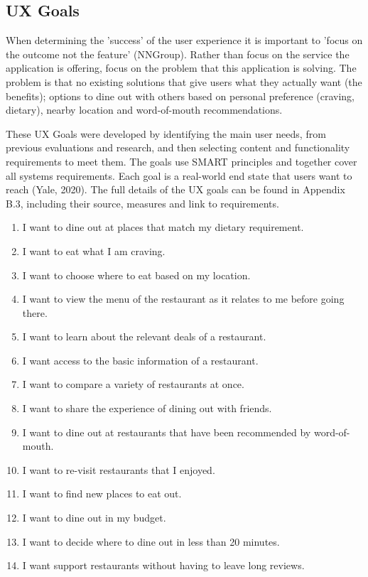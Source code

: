 \documentclass[a4 paper, 12pt]{article}
\begin{document}
\subsection{UX Goals}
When determining the 'success' of the user experience it is important to 'focus on the outcome not the feature' (NNGroup). Rather than focus on the service the application is offering, focus on the problem that this application is solving. The problem is that no existing solutions that give users what they actually want (the benefits); options to dine out with others based on personal preference (craving, dietary), nearby location and word-of-mouth recommendations.

These UX Goals were developed by identifying the main user needs, from previous evaluations and research, and then selecting content and functionality requirements to meet them. The goals use SMART principles and together cover all systems requirements. Each goal is a real-world end state that users want to reach (Yale, 2020). The full details of the UX goals can be found in Appendix B.3, including their source, measures and link to requirements.
    \begin{enumerate}
        \item I want to dine out at places that match my dietary requirement.
        \item I want to eat what I am craving.
        \item I want to choose where to eat based on my location.
        \item I want to view the menu of the restaurant as it relates to me before going there.
        \item I want to learn about the relevant deals of a restaurant.
        \item I want access to the basic information of a restaurant.
        \item I want to compare a variety of restaurants at once.
        \item I want to share the experience of dining out with friends.
        \item I want to dine out at restaurants that have been recommended by word-of-mouth.
        \item I want to re-visit restaurants that I enjoyed.
        \item I want to find new places to eat out.
        \item I want to dine out in my budget.
        \item I want to decide where to dine out in less than 20 minutes.
        \item I want support restaurants without having to leave long reviews.
    \end{enumerate}
\end{document}
